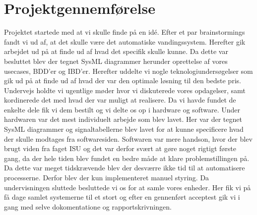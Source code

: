 \section{Projektgennemførelse}
Projektet startede med at vi skulle finde på en idé. Efter et par brainstormings fandt vi ud af, at det skulle være det automatiske vandingssystem. Herefter gik arbejdet ud på at finde ud af hvad det specifik skulle kunne. Da dette var besluttet blev der tegnet SysML diagrammer herunder oprettelse af vores usecases, BDD'er og IBD'er. Herefter uddelte vi nogle teknologiundersøgelser som gik ud på at finde ud af hvad der var den optimale løsning til den bedste pris. Undervejs holdte vi ugentlige møder hvor vi diskuterede vores opdagelser, samt kordinerede det med hvad der var muligt at realisere. Da vi havde fundet de enkelte dele fik vi dem bestilt og vi delte os op i hardware og software. Under hardwaren var det mest individuelt arbejde som blev lavet. Her var der tegnet SysML diagrammer og signaltabellerne blev lavet for at kunne specificere hvad der skulle modtages fra softwaresiden. Softwaren var mere handson, hvor der blev brugt viden fra faget ISU og det var derfor svært at gøre noget rigtigt første gang, da der hele tiden blev fundet en bedre måde at klare problemstillingen på. Da dette var meget tidskrævende blev der desværre ikke tid til at automatisere processerne. Derfor blev der kun implementeret manuel styring. Da undervisningen sluttede besluttede vi os for at samle vores enheder. Her fik vi på få dage samlet systemerne til et stort og efter en gennenført acceptest gik vi i gang med selve dokomentatione  og rapportskrivningen. 